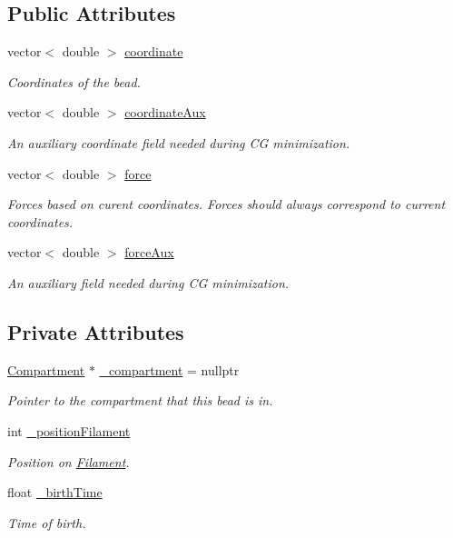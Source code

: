 \subsection*{Public Attributes}
\begin{DoxyCompactItemize}
\item 
vector$<$ double $>$ \hyperlink{classBead_a8c9c7d97a682694bf3b16a0922b23786}{coordinate}
\begin{DoxyCompactList}\small\item\em Coordinates of the bead. \end{DoxyCompactList}\item 
vector$<$ double $>$ \hyperlink{classBead_a4d46596f52ee0ce95e3e717483e1a921}{coordinate\+Aux}
\begin{DoxyCompactList}\small\item\em An auxiliary coordinate field needed during C\+G minimization. \end{DoxyCompactList}\item 
vector$<$ double $>$ \hyperlink{classBead_afc556d77d1d80e11c1256e89bba0db66}{force}
\begin{DoxyCompactList}\small\item\em Forces based on curent coordinates. Forces should always correspond to current coordinates. \end{DoxyCompactList}\item 
vector$<$ double $>$ \hyperlink{classBead_a59758227cd7afbb3ec5fbcafe32773b8}{force\+Aux}
\begin{DoxyCompactList}\small\item\em An auxiliary field needed during C\+G minimization. \end{DoxyCompactList}\end{DoxyCompactItemize}
\subsection*{Private Attributes}
\begin{DoxyCompactItemize}
\item 
\hyperlink{classCompartment}{Compartment} $\ast$ \hyperlink{classBead_ac9d2080d5d8f80f60535dfeea9cd38e9}{\+\_\+compartment} = nullptr
\begin{DoxyCompactList}\small\item\em Pointer to the compartment that this bead is in. \end{DoxyCompactList}\item 
int \hyperlink{classBead_a0eafb8f259549846d4714e6120cbc87c}{\+\_\+position\+Filament}
\begin{DoxyCompactList}\small\item\em Position on \hyperlink{classFilament}{Filament}. \end{DoxyCompactList}\item 
float \hyperlink{classBead_a356c8525fcf176bca4cd539f735c1de6}{\+\_\+birth\+Time}
\begin{DoxyCompactList}\small\item\em Time of birth. \end{DoxyCompactList}\end{DoxyCompactItemize}


